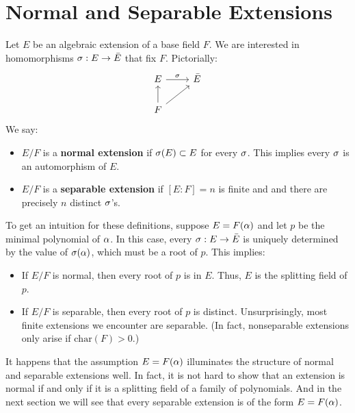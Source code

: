\section{Normal and Separable Extensions}

Let $E$ be an algebraic extension of a base field $F$. We are interested in homomorphisms $\sigma: E \to \bar{E}$ that fix $F$. Pictorially:
\[
    \begin{tikzcd}
        E \arrow[r, "\sigma"]  & \bar{E} \\
        F \arrow[u] \arrow[ru] &        
    \end{tikzcd}
\]
We say:
\begin{itemize}
    \item $E/F$ is a \textbf{normal extension} if $\sigma(E) \subset E$ for every $\sigma$. This implies every $\sigma$ is an automorphism of $E$.
    \item $E/F$ is a \textbf{separable extension} if $[E : F] = n$ is finite and and there are precisely $n$ distinct $\sigma$'s.
\end{itemize}

To get an intuition for these definitions, suppose $E = F(\alpha)$ and let $p$ be the minimal polynomial of $\alpha$. In this case, every $\sigma: E \to \bar{E}$ is uniquely determined by the value of $\sigma(\alpha)$, which must be a root of $p$. This implies:
\begin{itemize}
    \item If $E/F$ is normal, then every root of $p$ is in $E$. Thus, $E$ is the splitting field of $p$.
    \item If $E/F$ is separable, then every root of $p$ is distinct. Unsurprisingly, most finite extensions we encounter are separable. (In fact, nonseparable extensions only arise if $\text{char}(F) > 0$.)
\end{itemize}

It happens that the assumption $E = F(\alpha)$ illuminates the structure of normal and separable extensions well. In fact, it is not hard to show that an extension is normal if and only if it is a splitting field of a family of polynomials. And in the next section we will see that every separable extension is of the form $E = F(\alpha)$.
